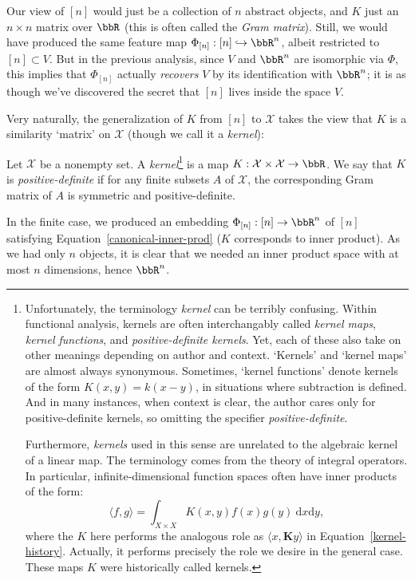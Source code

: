 \documentclass[twoside,11pt]{homework}
\begin{document}
Our view of $[n]$ would just be a collection of $n$ abstract objects, and $K$ just an $n\times n$ matrix over $\bbR$ (this is often called the \emph{Gram matrix}). Still, we would have produced the same feature map $\Phi_{[n]}: [n] \hookrightarrow \bbR^n$, albeit restricted to $[n]\subset V$. But in the previous analysis, since $V$ and $\bbR^n$ are isomorphic via $\Phi$, this implies that $\Phi_{[n]}$ actually \emph{recovers} $V$ by its identification with $\bbR^n$; it is as though we've discovered the secret that $[n]$ lives inside the space $V$.

Very naturally, the generalization of $K$ from $[n]$ to $\mathcal{X}$ takes the view that $K$ is a similarity `matrix' on $\mathcal{X}$ (though we call it a \emph{kernel}):
\begin{definition} Let $\mathcal{X}$ be a nonempty set. A \emph{kernel}\footnote{Unfortunately, the terminology \emph{kernel} can be terribly confusing. Within functional analysis, kernels are often interchangably called \emph{kernel maps}, \emph{kernel functions}, and \emph{positive-definite kernels}. Yet, each of these also take on other meanings depending on author and context. `Kernels' and `kernel maps' are almost always synonymous. Sometimes, `kernel functions' denote kernels of the form $K(x,y) = k(x-y)$, in situations where subtraction is defined. And in many instances, when context is clear, the author cares only for positive-definite kernels, so omitting the specifier \emph{positive-definite}.

    Furthermore, \emph{kernels} used in this sense are unrelated to the algebraic kernel of a linear map. The terminology comes from the theory of integral operators. In particular, infinite-dimensional function spaces often have inner products of the form:
    \[\langle f, g\rangle = \int_{X \times X} K(x,y) f(x) g(y) \ \mathrm{d}x \mathrm{d}y,\]
    where the $K$ here performs the analogous role as $\langle x, \mathbf{K}y\rangle$ in Equation~\ref{kernel-history}. Actually, it performs precisely the role we desire in the general case. These maps $K$ were historically called kernels.
  } is a map $K : \mathcal{X} \times \mathcal{X} \to \bbR$. We say that $K$ is \emph{positive-definite} if for any finite subsets $A$ of $\mathcal{X}$, the corresponding Gram matrix of $A$ is symmetric and positive-definite.
\end{definition}

In the finite case, we produced an embedding $\Phi_{[n]} : [n] \to \bbR^n$ of $[n]$ satisfying Equation~\ref{canonical-inner-prod} ($K$ corresponds to inner product). As we had only $n$ objects, it is clear that we needed an inner product space with at most $n$ dimensions, hence $\bbR^n$.
\end{document}
